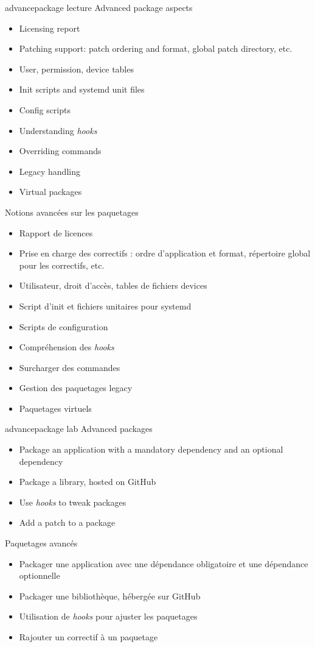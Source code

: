 {advancepackage}
{lecture}
{Advanced package aspects}
{
  \begin{itemize}
  \item Licensing report
  \item Patching support: patch ordering and format, global patch directory, etc.
  \item User, permission, device tables
  \item Init scripts and systemd unit files
  \item Config scripts
  \item Understanding {\em hooks}
  \item Overriding commands
  \item Legacy handling
  \item Virtual packages
  \end{itemize}
}
{Notions avancées sur les paquetages}
{
  \begin{itemize}
  \item Rapport de licences
  \item Prise en charge des correctifs : ordre d'application et format,
	répertoire global pour les correctifs, etc.
  \item Utilisateur, droit d'accès, tables de fichiers devices
  \item Script d'init et fichiers unitaires pour systemd
  \item Scripts de configuration
  \item Compréhension des {\em hooks}
  \item Surcharger des commandes
  \item Gestion des paquetages legacy
  \item Paquetages virtuels
  \end{itemize}
}
{advancepackage}
{lab}
{Advanced packages}
{
  \begin{itemize}
  \item Package an application with a mandatory dependency and an
    optional dependency
  \item Package a library, hosted on GitHub
  \item Use {\em hooks} to tweak packages
  \item Add a patch to a package
  \end{itemize}
}
{Paquetages avancés}
{
  \begin{itemize}
  \item Packager une application avec une dépendance obligatoire et
    une dépendance optionnelle
  \item Packager une bibliothèque, hébergée sur GitHub
  \item Utilisation de {\em hooks} pour ajuster les paquetages
  \item Rajouter un correctif à un paquetage
  \end{itemize}
}
